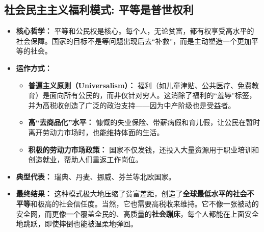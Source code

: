 \documentclass[a5paper, 11pt, openany]{ctexbook}
\begin{document}
\subsection{社会民主主义福利模式: 平等是普世权利}
\begin{itemize}
    \item \textbf{核心哲学：} 平等和公民权是核心。每个人，无论贫富，都有权享受高水平的社会保障。国家的目标不是等问题出现后去“补救”，而是主动塑造一个更加平等的社会。
    \item \textbf{运作方式：}
    \begin{itemize}
        \item \textbf{普遍主义原则（Universalism）：} 福利（如儿童津贴、公共医疗、免费教育）是面向所有公民的，而非仅针对穷人。这消除了福利的“羞辱”标签，并为高税收创造了广泛的政治支持——因为中产阶级也是受益者。
        \item \textbf{高“去商品化”水平：} 慷慨的失业保险、带薪病假和育儿假，让公民在暂时离开劳动力市场时，也能维持体面的生活。
        \item \textbf{积极的劳动力市场政策：} 国家不仅发钱，还投入大量资源用于职业培训和创造就业，帮助人们重返工作岗位。
    \end{itemize}
    \item \textbf{典型代表：} 瑞典、丹麦、挪威、芬兰等北欧国家。
    \item \textbf{最终结果：} 这种模式极大地压缩了贫富差距，创造了\textbf{全球最低水平的社会不平等}和极高的社会信任度。当然，它也需要高税收来维持。它不像一张被动的安全网，而更像一个覆盖全民的、高质量的\textbf{社会蹦床}，每个人都能在上面安全地跳跃，即使摔倒也能被温柔地弹回。
\end{itemize}
\end{document}
